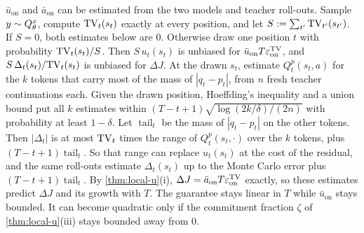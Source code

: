 \begin{remark}\label{rem:measure-u}
$\bar u_{\mathrm{on}}$ and $\bar a_{\mathrm{on}}$ can be estimated from the two models and teacher roll-outs. Sample $y\sim Q^{x}_{\theta}$, compute $\mathrm{TV}_t(s_t)$
exactly at every position, and let $S:=\sum_{t'}\mathrm{TV}_{t'}(s_{t'})$. If $S=0$, both estimates below are $0$. Otherwise draw
one position $t$ with probability $\mathrm{TV}_t(s_t)/S$. Then $S\,u_t(s_t)$ is unbiased for $\bar u_{\mathrm{on}}T\varepsilon_{\mathrm{on}}^{\mathrm{TV}}$, and $S\,\Delta_t(s_t)/\mathrm{TV}_t(s_t)$
is unbiased for $\Delta J$. At the drawn $s_t$, estimate $Q^p_t(s_t,a)$ for the $k$ tokens that carry most of the mass of
$|q_t-p_t|$, from $n$ fresh teacher continuations each. Given the drawn position, Hoeffding's inequality and a
union bound put all $k$ estimates within $(T-t+1)\sqrt{\log(2k/\delta)/(2n)}$ with probability at least $1-\delta$. Let
$\operatorname{tail}_t$ be the mass of $|q_t-p_t|$ on the other tokens. Then $|\Delta_t|$ is at most $\mathrm{TV}_t$ times the range of
$Q^p_t(s_t,\cdot)$ over the $k$ tokens, plus $(T-t+1)\operatorname{tail}_t$. So that range can replace $u_t(s_t)$ at the cost of the
residual, and the same roll-outs estimate $\Delta_t(s_t)$ up to the Monte Carlo error plus $(T-t+1)\operatorname{tail}_t$. By
\cref{thm:local-u}(i), $\Delta J=\bar a_{\mathrm{on}}T\varepsilon_{\mathrm{on}}^{\mathrm{TV}}$ exactly, so these estimates predict $\Delta J$ and its growth with $T$. The
guarantee stays linear in $T$ while $\bar u_{\mathrm{on}}$ stays bounded. It can become quadratic only if the commitment
fraction $\zeta$ of \cref{thm:local-u}(iii) stays bounded away from $0$.
\end{remark}
